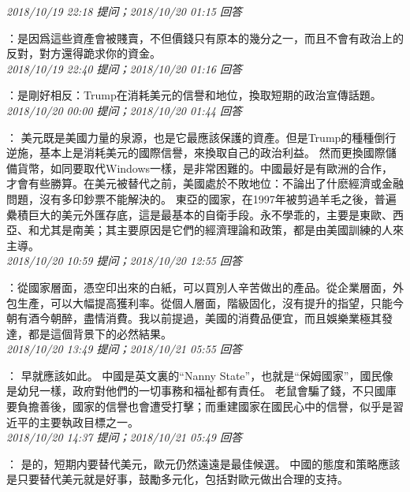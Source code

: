 \documentclass[twocolumn]{ctexart}
\begin{document}
\textit{\hfill\noindent\small 2018/10/19 22:18 提问；2018/10/20 01:15 回答}

：是因爲這些資產會被賤賣，不但價錢只有原本的幾分之一，而且不會有政治上的反對，對方還得跪求你的資金。
\\

\textit{\hfill\noindent\small 2018/10/19 22:40 提问；2018/10/20 01:16 回答}

：是剛好相反：Trump在消耗美元的信譽和地位，換取短期的政治宣傳話題。
\\

\textit{\hfill\noindent\small 2018/10/20 00:00 提问；2018/10/20 01:44 回答}

：
美元既是美國力量的泉源，也是它最應該保護的資產。但是Trump的種種倒行逆施，基本上是消耗美元的國際信譽，來換取自己的政治利益。
然而更換國際儲備貨幣，如同要取代Windows一樣，是非常困難的。中國最好是有歐洲的合作，才會有些勝算。在美元被替代之前，美國處於不敗地位：不論出了什麽經濟或金融問題，沒有多印鈔票不能解決的。
東亞的國家，在1997年被剪過羊毛之後，普遍纍積巨大的美元外匯存底，這是最基本的自衛手段。永不學乖的，主要是東歐、西亞、和尤其是南美；其主要原因是它們的經濟理論和政策，都是由美國訓練的人來主導。
\\

\textit{\hfill\noindent\small 2018/10/20 10:59 提问；2018/10/20 12:55 回答}

：從國家層面，憑空印出來的白紙，可以買別人辛苦做出的產品。從企業層面，外包生產，可以大幅提高獲利率。從個人層面，階級固化，沒有提升的指望，只能今朝有酒今朝醉，盡情消費。我以前提過，美國的消費品便宜，而且娛樂業極其發達，都是這個背景下的必然結果。
\\

\textit{\hfill\noindent\small 2018/10/20 13:49 提问；2018/10/21 05:55 回答}

：
早就應該如此。
中國是英文裏的“Nanny State”，也就是“保姆國家”，國民像是幼兒一樣，政府對他們的一切事務和福祉都有責任。
老鼠會騙了錢，不只國庫要負擔善後，國家的信譽也會遭受打擊；而重建國家在國民心中的信譽，似乎是習近平的主要執政目標之一。
\\

\textit{\hfill\noindent\small 2018/10/20 14:37 提问；2018/10/21 05:49 回答}

：
是的，短期内要替代美元，歐元仍然遠遠是最佳候選。
中國的態度和策略應該是只要替代美元就是好事，鼓勵多元化，包括對歐元做出合理的支持。
\\
\end{document}
